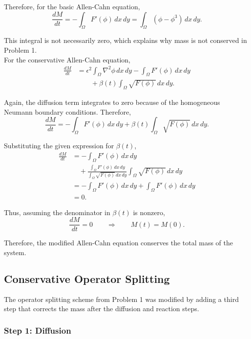 \documentclass[11pt]{article}
\begin{document}
Therefore, for the basic Allen-Cahn equation,
\[
    \frac{dM}{dt}
    =-\int_\Omega F'(\phi)\,dx\,dy
    =\int_\Omega(\phi-\phi^3)\,dx\,dy.
\]

This integral is not necessarily zero, which explains why mass is not conserved in Problem 1. \\

For the conservative Allen-Cahn equation,
\begin{align*}
    \frac{dM}{dt}
    &=
    \epsilon^2\int_\Omega\nabla^2\phi\,dx\,dy
    -\int_\Omega F'(\phi)\,dx\,dy\\
    &\qquad
    +\beta(t)\int_\Omega\sqrt{F(\phi)}\,dx\,dy.
\end{align*}

Again, the diffusion term integrates to zero because 
of the homogeneous Neumann boundary conditions. 
Therefore,
\[
    \frac{dM}{dt}
    =
    -\int_\Omega F'(\phi)\,dx\,dy
    +\beta(t)\int_\Omega\sqrt{F(\phi)}\,dx\,dy.
\]

Substituting the given expression for $\beta(t)$,
\begin{align*}
    \frac{dM}{dt}
    &=
    -\int_\Omega F'(\phi)\,dx\,dy\\
    &\quad+
    \frac{
        \displaystyle\int_\Omega F'(\phi)\,dx\,dy
    }{
        \displaystyle\int_\Omega\sqrt{F(\phi)}\,dx\,dy
    }
    \int_\Omega\sqrt{F(\phi)}\,dx\,dy\\
    &=
    -\int_\Omega F'(\phi)\,dx\,dy
    +\int_\Omega F'(\phi)\,dx\,dy\\
    &=0.
\end{align*}

Thus, assuming the denominator in $\beta(t)$ is nonzero,
\[
    \boxed{
        \frac{dM}{dt}=0
        \qquad\Longrightarrow\qquad
        M(t)=M(0).
    }
\]

Therefore, the modified Allen-Cahn equation conserves the total mass of the system.

\subsection*{Conservative Operator Splitting}

The operator splitting scheme from Problem 1 was modified by adding a third step that corrects the mass after the diffusion and reaction steps.

\subsubsection*{Step 1: Diffusion}
\end{document}
